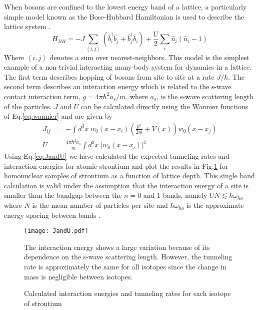 When bosons are confined to the lowest energy band of a lattice, a particularly simple model known as the Bose-Hubbard Hamiltonian is used to describe the lattice system \cite{Jaksch1998}. 
	\begin{equation} \label{eq:boseHubbard}
		 H_{BH} = -J \sum_{\left< i,j \right>} \left(\hat{b}^{\dagger}_i \hat{b}_j + \hat{b}^{\dagger}_j \hat{b}_i \right)
		 		  + \frac{U}{2} \sum_i \hat{n}_i(\hat{n}_i - 1)
	\end{equation}
Where $\left< i,j \right>$ denotes a sum over nearest-neighbors. This model is the simplest example of a non-trivial interacting many-body system for dynamics in a lattice. The first term describes hopping of bosons from site to site at a rate $J/ \hbar$. The second term describes an interaction energy which is related to the s-wave contact interaction term, $g = 4 \pi \hbar^2 a_s/m$, where $a_s$, is the s-wave scattering length of the particles. $J$ and $U$ can be calculated directly using the Wannier functions of Eq.\;\ref{eq:wannier} and are given by \cite{Jaksch2005}
	\begin{equation} \label{eq:JandU}
	\begin{aligned}
		 J_{ij} &= - \int d^3x \; w_0(x-x_i) \left( \frac{p^2}{2m}+V(x) \right) w_0(x-x_j)\\
		 U &= \frac{4 \pi \hbar^2 a_s}{m} \int d^3x \; \left| w_0(x-x_i)\right|^4
	\end{aligned}
	\end{equation}
Using Eq.\;\ref{eq:JandU} we have calculated the expected tunneling rates and interaction energies for atomic strontium and plot the results in Fig.\;\ref{fig:fig_JandU} for homonuclear samples of strontium as a function of lattice depth. This single band calculation is valid under the assumption that the interaction energy of a site is smaller than the bandgap between the $n= 0$ and $1$ bands, namely $U N \lesssim \hbar \omega_{ho}$ where $N$ is the mean number of particles per site and $\hbar \omega_{ho}$ is the approximate energy spacing between bands \cite{Rey2004}. 


\begin{figure} \label{fig:fig_JandU}
	\centerline{
	\texttt{[image: JandU.pdf]}}
	\caption{Calculated interaction energies and tunneling rates for each isotope of strontium}{The interaction energy shows a large variation because of its dependence on the s-wave scattering length. However, the tunneling rate is approximately the same for all isotopes since the change in mass is negligible between isotopes.}
\end{figure}
	
